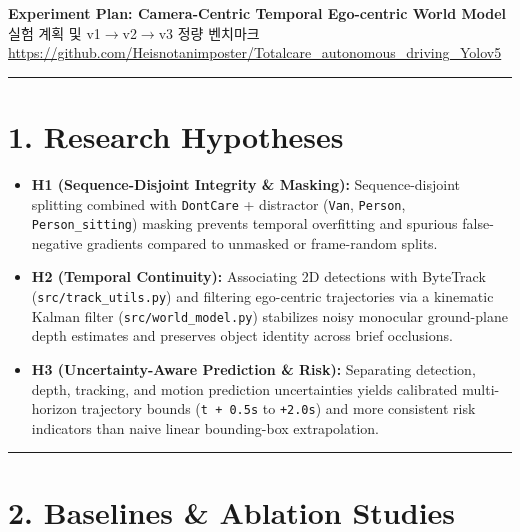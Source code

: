 \documentclass[10.5pt,a4paper]{article}
\begin{document}
\begin{center}
{\LARGE\bfseries Experiment Plan: Camera-Centric Temporal Ego-centric World Model}\\[6pt]
{\normalsize\color{gray} 실험 계획 및 v1$\rightarrow$v2$\rightarrow$v3 정량 벤치마크}\\[4pt]
{\small\href{https://github.com/Heisnotanimposter/Totalcare_autonomous_driving_Yolov5}{https://github.com/Heisnotanimposter/Totalcare\_autonomous\_driving\_Yolov5}}
\end{center}
\vspace{4pt}
\hrule
\vspace{8pt}

\section{1. Research Hypotheses}

\begin{itemize}[leftmargin=1.5em,itemsep=2pt]
\item \textbf{H1 (Sequence-Disjoint Integrity \& Masking):} Sequence-disjoint splitting combined with \texttt{DontCare} + distractor (\texttt{Van}, \texttt{Person}, \texttt{Person\_\allowbreak{}sitting}) masking prevents temporal overfitting and spurious false-negative gradients compared to unmasked or frame-random splits.
\item \textbf{H2 (Temporal Continuity):} Associating 2D detections with ByteTrack (\texttt{src/\allowbreak{}track\_\allowbreak{}utils.\allowbreak{}py}) and filtering ego-centric trajectories via a kinematic Kalman filter (\texttt{src/\allowbreak{}world\_\allowbreak{}model.\allowbreak{}py}) stabilizes noisy monocular ground-plane depth estimates and preserves object identity across brief occlusions.
\item \textbf{H3 (Uncertainty-Aware Prediction \& Risk):} Separating detection, depth, tracking, and motion prediction uncertainties yields calibrated multi-horizon trajectory bounds (\texttt{t + 0.\allowbreak{}5s} to \texttt{+2.\allowbreak{}0s}) and more consistent risk indicators than naive linear bounding-box extrapolation.
\end{itemize}

\par\noindent\rule{\textwidth}{0.4pt}\par\medskip

\section{2. Baselines \& Ablation Studies}
\end{document}
